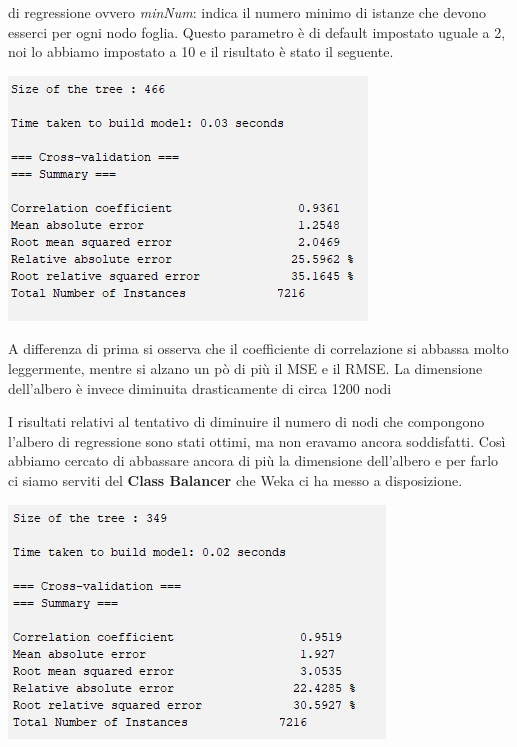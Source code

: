 \documentclass[a4paper, 11pt, oneside]{report}
\begin{document}
                di regressione ovvero \textit{minNum}: indica il numero minimo di istanze che devono esserci per ogni nodo
                foglia.
                Questo parametro è di default impostato uguale a 2, noi lo abbiamo impostato a 10 e il risultato è stato il seguente.
                \par \noindent
                \begin{center}
                    \includegraphics{metricheMinNum10}
                \end{center}
                \par \noindent A differenza di prima si osserva che il coefficiente di correlazione si abbassa molto leggermente,
                mentre si alzano un pò di più il MSE e il RMSE.
                La dimensione dell'albero è invece diminuita drasticamente di circa 1200 nodi
                \par \noindent
                \par \noindent I risultati relativi al tentativo di diminuire il numero di nodi che compongono l'albero di
                regressione sono stati ottimi, ma non eravamo ancora soddisfatti.
                Così abbiamo cercato di abbassare ancora di più la dimensione dell'albero e per farlo ci siamo serviti del
                \textbf{Class Balancer} che Weka ci ha messo a disposizione.
                \par \noindent
                \begin{center}
                    \includegraphics{metricheDefinitive}
                \end{center}
\end{document}
